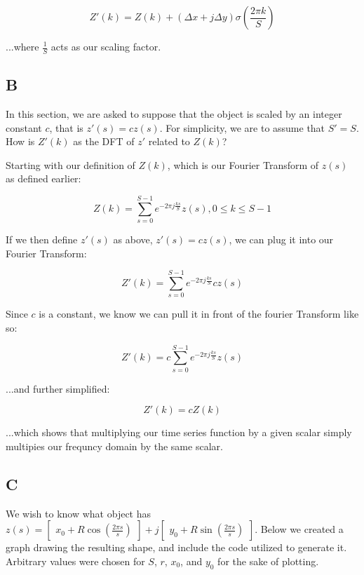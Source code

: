 \documentclass{article}
\begin{document}
\begin{equation}
    Z'(k) = Z(k) + (\Delta x + j \Delta y) \sigma(\frac{2 \pi k}{S})
\end{equation}

\noindent ...where $\frac{1}{S}$ acts as our scaling factor.

\subsection*{B}

In this section, we are asked to suppose that the object is scaled by an integer constant $c$, that is $z'(s)=cz(s)$. For simplicity, we are to assume that $S'=S$. How is $Z'(k)$ as the DFT of $z'$ related to $Z(k)$?

\noindent Starting with our definition of $Z(k)$, which is our Fourier Transform of $z(s)$ as defined earlier:

\begin{equation}
    Z(k) = \sum^{S-1}_{s=0} e^{-2\pi j \frac{ks}{S}} z(s), 0\leq k \leq S-1
\end{equation}

\noindent If we then define $z'(s)$ as above, $z'(s)=cz(s)$, we can plug it into our Fourier Transform:

\begin{equation}
    Z'(k) = \sum^{S-1}_{s=0} e^{-2\pi j \frac{ks}{S}} cz(s)
\end{equation}

\noindent Since $c$ is a constant, we know we can pull it in front of the fourier Transform like so:

\begin{equation}
    Z'(k) = c \sum^{S-1}_{s=0} e^{-2\pi j \frac{ks}{S}} z(s) 
\end{equation}

\noindent ...and further simplified:

\begin{equation}
    Z'(k) = c Z(k)
\end{equation}

\noindent ...which shows that multiplying our time series function by a given scalar simply multipies our frequncy domain by the same scalar.


\subsection*{C}

We wish to know what object has $z(s)=\begin{bmatrix}x_0 + R\cos(\frac{2\pi s}{s})\end{bmatrix}+j\begin{bmatrix}y_0 + R \sin(\frac{2\pi s}{s})\end{bmatrix}$. Below we created a graph drawing the resulting shape, and include the code utilized to generate it. Arbitrary values were chosen for $S$, $r$, $x_0$, and $y_0$ for the sake of plotting.
\end{document}

